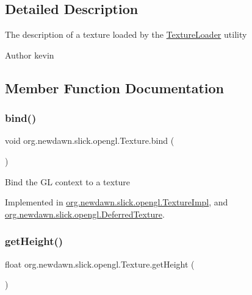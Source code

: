 \subsection{Detailed Description}
The description of a texture loaded by the \mbox{\hyperlink{classorg_1_1newdawn_1_1slick_1_1opengl_1_1_texture_loader}{Texture\+Loader}} utility

\begin{DoxyAuthor}{Author}
kevin 
\end{DoxyAuthor}


\subsection{Member Function Documentation}
\mbox{\label{interfaceorg_1_1newdawn_1_1slick_1_1opengl_1_1_texture_a97c02b82a8170c4c0bccb570dc872873}} 
\subsubsection{\texorpdfstring{bind()}{bind()}}
{\footnotesize\ttfamily void org.\+newdawn.\+slick.\+opengl.\+Texture.\+bind (\begin{DoxyParamCaption}{ }\end{DoxyParamCaption})}

Bind the GL context to a texture 

Implemented in \mbox{\hyperlink{classorg_1_1newdawn_1_1slick_1_1opengl_1_1_texture_impl_a181498048d34fa8da8a86613d524f68e}{org.\+newdawn.\+slick.\+opengl.\+Texture\+Impl}}, and \mbox{\hyperlink{classorg_1_1newdawn_1_1slick_1_1opengl_1_1_deferred_texture_a5cd19d9ae09f098e85030b777e6de069}{org.\+newdawn.\+slick.\+opengl.\+Deferred\+Texture}}.

\mbox{\label{interfaceorg_1_1newdawn_1_1slick_1_1opengl_1_1_texture_a5a31b691118b19d5fa0bc605fa458ccd}} 
\subsubsection{\texorpdfstring{get\+Height()}{getHeight()}}
{\footnotesize\ttfamily float org.\+newdawn.\+slick.\+opengl.\+Texture.\+get\+Height (\begin{DoxyParamCaption}{ }\end{DoxyParamCaption})}

